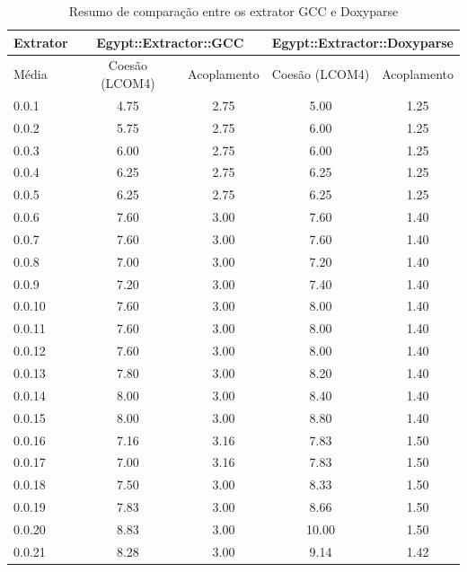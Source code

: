 \begin{table}
\caption{Resumo de comparação entre os extrator GCC e Doxyparse}
\centering
\begin{tabular}{| l | c c | c c |}
\hline
Extrator  & \multicolumn{2}{|c|}{Egypt::Extractor::GCC} & \multicolumn{2}{|c|}{Egypt::Extractor::Doxyparse} \\
\hline
Média     & Coesão (LCOM4)  & Acoplamento    & Coesão (LCOM4)  & Acoplamento  \\
\hline
0.0.1     & 4.75            & 2.75           & 5.00            & 1.25         \\
0.0.2     & 5.75            & 2.75           & 6.00            & 1.25         \\
0.0.3     & 6.00            & 2.75           & 6.00            & 1.25         \\
0.0.4     & 6.25            & 2.75           & 6.25            & 1.25         \\
0.0.5     & 6.25            & 2.75           & 6.25            & 1.25         \\
0.0.6     & 7.60            & 3.00           & 7.60            & 1.40         \\
0.0.7     & 7.60            & 3.00           & 7.60            & 1.40         \\
0.0.8     & 7.00            & 3.00           & 7.20            & 1.40         \\
0.0.9     & 7.20            & 3.00           & 7.40            & 1.40         \\
0.0.10    & 7.60            & 3.00           & 8.00            & 1.40         \\
0.0.11    & 7.60            & 3.00           & 8.00            & 1.40         \\
0.0.12    & 7.60            & 3.00           & 8.00            & 1.40         \\
0.0.13    & 7.80            & 3.00           & 8.20            & 1.40         \\
0.0.14    & 8.00            & 3.00           & 8.40            & 1.40         \\
0.0.15    & 8.00            & 3.00           & 8.80            & 1.40         \\
0.0.16    & 7.16            & 3.16           & 7.83            & 1.50         \\
0.0.17    & 7.00            & 3.16           & 7.83            & 1.50         \\
0.0.18    & 7.50            & 3.00           & 8.33            & 1.50         \\
0.0.19    & 7.83            & 3.00           & 8.66            & 1.50         \\
0.0.20    & 8.83            & 3.00           & 10.00           & 1.50         \\
0.0.21    & 8.28            & 3.00           & 9.14            & 1.42         \\
\hline
\end{tabular}
\label{comparacao-metricas}
\end{table}

